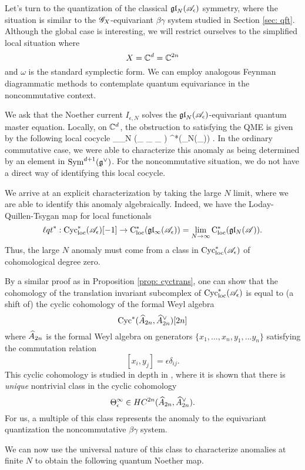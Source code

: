 Let's turn to the quantization of the classical $\fgl_N(\sA_\epsilon)$ symmetry, where the situation is similar to the $\sG_X$-equivariant $\beta\gamma$ system studied in Section \ref{sec: qft}.
Although the global case is interesting, we will restrict ourselves to the simplified local situation where 
\[
X = \CC^d = \CC^{2n}
\] 
and $\omega$ is the standard symplectic form. 
We can employ analogous Feynman diagrammatic methods to contemplate quantum equivariance in the noncommutative context.

We ask that the Noether current $I_{\epsilon,N}$ solves the $\fgl_N(\sA_{\epsilon})$-equivariant quantum master equation.
Locally, on $\CC^d$, the obstruction to satisfying the QME is given by the following local cocycle 
\beqn\label{noncommobs}
\int \Tr_{\fgl_N} (\alpha \star_{\epsilon} \partial \alpha \star_{\epsilon} \cdots \star_{\epsilon} \partial \alpha) \in \cloc^*(\fgl_N(\sA_\epsilon)) .
\eeqn
In the ordinary commutative case, we were able to characterize this anomaly as being determined by an element in $\Sym^{d+1}(\fg^\vee)$.
For the noncommutative situation, we do not have a direct way of identifying this local cocycle.

We arrive at an explicit characterization by taking the large $N$ limit, where we are able to identify this anomaly algebraically. 
Indeed, we have the Loday-Quillen-Tsygan map for local functionals
\[
\lqt^* : \Cycloc^*(\sA_\epsilon)[-1] \to \cloc^*(\gl_\infty(\sA_\epsilon)) = \lim_{N \to \infty} \cloc^*(\gl_N( \sA))  .
\]
Thus, the large $N$ anomaly must come from a class in $\Cycloc^*(\sA_\epsilon)$ of cohomological degree zero. 

By a similar proof as in Proposition \ref{prop: cyctrans}, one can show that the cohomology of the translation invariant subcomplex of $\Cycloc^*(\sA_\epsilon)$ is equal to (a shift of) the cyclic cohomology of the formal Weyl algebra
\[
\Cyc^*(\Hat{A}_{2n}, \Hat{A}_{2n}^\vee) [2n]
\]
where $\Hat{A}_{2n}$ is the formal Weyl algebra on generators $\{x_1,\ldots, x_n, y_1,\ldots y_n\}$ satisfying the commutation relation
\[
[x_i, y_j] = \epsilon \delta_{ij} .
\] 
This cyclic cohomology is studied in depth in \cite{Willwacher}, where it is shown that there is {\em unique} nontrivial class in the cyclic cohomology
\[
\Theta_{\epsilon}^\infty \in HC^{2n} (\Hat{A}_{2n}, \Hat{A}_{2n}^\vee) .
\]
For us, a multiple of this class represents the anomaly to the equivariant quantization the noncommutative $\beta\gamma$ system. 

We can now use the universal nature of this class to characterize anomalies at finite $N$ to obtain the following quantum Noether map. 

